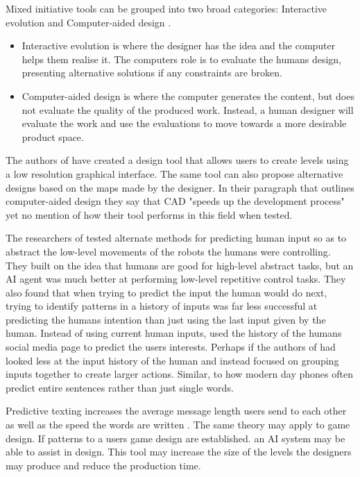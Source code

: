 \documentclass[journal]{IEEEtran}
\begin{document}
Mixed initiative tools can be grouped into two broad categories: Interactive evolution and Computer-aided design \cite{liapis2016mixed}. 
\begin{itemize}
    \item Interactive evolution is where the designer has the idea and the computer helps them realise it. The computers role is to evaluate the humans design, presenting alternative solutions if any constraints are broken. 
    
    \item Computer-aided design is where the computer generates the content, but does not evaluate the quality of the produced work. Instead, a human designer will evaluate the work and use the evaluations to move towards a more desirable product space.
\end{itemize}

The authors of \cite{liapis2013sentient} have created a design tool that allows users to create levels using a low resolution graphical interface. The same tool can also propose alternative designs based on the maps made by the designer. In their paragraph that outlines computer-aided design they say that CAD "speeds up the development process" yet no mention of how their tool performs in this field when tested.

The researchers of \cite{chipalkatty2013less} tested alternate methods for predicting human input so as to abstract the low-level movements of the robots the humans were controlling. They built on the idea that humans are good for high-level abstract tasks, but an AI agent was much better at performing low-level repetitive control tasks. They also found that when trying to predict the input the human would do next, trying to identify patterns in a history of inputs was far less successful at predicting the humans intention than just using the last input given by the human. Instead of using current human inputs, \cite{bhatia2016targeted} used the history of the humans social media page to predict the users interests. Perhaps if the authors of \cite{chipalkatty2013less} had looked less at the input history of the human and instead focused on grouping inputs together to create larger actions. Similar,  to how modern day phones often predict entire sentences rather than just single words.

Predictive texting increases the average message length users send to each other \cite{ling2005length} as well as the speed the words are written \cite{dunlop2000predictive}. The same theory may apply to game design. If patterns to a users game design are established. an AI system may be able to assist in design. This tool may increase the size of the levels the designers may produce and reduce the production time. 
\end{document}
